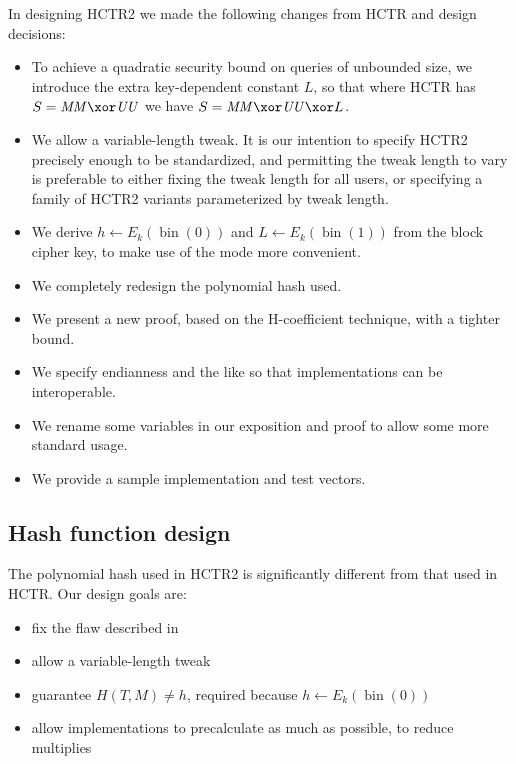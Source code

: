\documentclass[letterpaper,11pt]{article}
\newcommand*{\MM}{\mathit{MM}}
\newcommand*{\UU}{\mathit{UU}}
\DeclareMathOperator{\fromint}{bin}
\begin{document}
In designing HCTR2 we made the following changes from HCTR and design decisions:

\begin{itemize}
    \item To achieve a quadratic security bound
    on queries of unbounded size,
    we introduce the extra
    key-dependent constant \(L\),
    so that where HCTR has \(S = \MM \xor \UU\)
    we have \(S = \MM \xor \UU \xor L\).
    \item We allow a variable-length tweak. It is our intention to specify
    HCTR2 precisely enough to be standardized, and permitting the tweak length
    to vary is preferable to either fixing the tweak length for all users,
    or specifying a family of HCTR2 variants parameterized by tweak length.
    \item We derive \(h \gets E_k(\fromint(0))\)
    and \(L \gets E_k(\fromint(1))\) from the block cipher key, to make use of the
    mode more convenient.
    \item We completely redesign the polynomial hash used.
    \item We present a new proof, based on the H-coefficient technique,
    with a tighter bound.
    \item We specify endianness and the like so that implementations can be interoperable.
    \item We rename some variables in our exposition and proof to allow some more standard usage.
    \item We provide a sample implementation and test vectors.
\end{itemize}

\subsection{Hash function design}

The polynomial hash used in HCTR2 is significantly different from
that used in HCTR. Our design goals are:

\begin{itemize}
    \item fix the flaw described in \cite{kumarhctr}
    \item allow a variable-length tweak
    \item guarantee \(H(T, M) \neq h\), required
    because \(h \gets E_k(\fromint(0))\)
    \item allow implementations to precalculate as much as possible, to reduce multiplies
\end{itemize}
\end{document}
